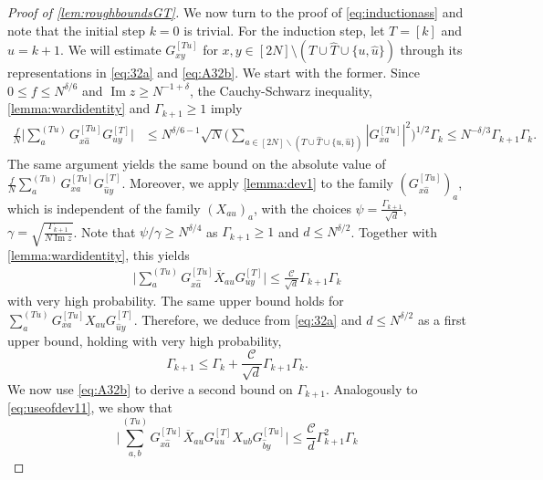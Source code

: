 \documentclass[10pt,a4paper]{amsart}
\DeclareMathOperator{\Ima}{Im}
\numberwithin{equation}{section}
\newcommand*\barr[1]{\overline{#1}}
\newcommand*\bset[1]{[#1]}
\newcommand*\ubarr[1]{{\widehat{#1}}}
\begin{document}
\begin{proof}[Proof of \cref{lem:roughboundsGT}]
		We now turn to the proof of \cref{eq:inductionass} and note that the initial step $k=0$ is trivial. For the induction step, let $T = [k]$ and $u =k+1$. 
		We will estimate $G_{xy}^{\bset{Tu}}$ for $x,y \in [2N]\setminus ( T \cup \ubarr{T} \cup \{u,\ubarr{u}\})$ through its representations in \cref{eq:32a} and \cref{eq:A32b}. 
		We start with the former. 
		Since  $0 \le f \le N^{\delta/6}$ and $\Ima z \ge N^{-1 + \delta}$, the Cauchy-Schwarz inequality,   \cref{lemma:wardidentity} and $\Gamma_{k+1} \geq 1$ imply
		\begin{align}
			\frac{f}{N}\biggl|\sum_{a}^{(Tu)} G_{x\ubarr{a}}^{\bset{Tu}} G_{uy}^{\bset{T}}\biggr|&\le N^{\delta/6 -1} \sqrt{N} \biggl( \sum_{a\in [2N] \backslash ( T \cup \ubarr{T} \cup \{u,\ubarr{u}\})}\left|G_{xa}^{\bset{Tu}}\right|^2\biggr)^{1/2}\Gamma_{k}
			\le N^{-\delta/3}  \Gamma_{k+1}\Gamma_k. \label{eq:boundoforf1}
		\end{align}
	 The same argument yields the same bound on the absolute value of $\frac{f}{N} \sum_{a}^{(Tu)} G_{xa}^{\bset{Tu}} G_{\ubarr{u}y}^{\bset{T}}$. Moreover, we apply     \cref{lemma:dev1} to the family $ (G_{x\ubarr{a}}^{\bset{Tu}})_{a}$, which is independent of the family $(X_{au})_{a}$, with the choices $\psi = \frac{\Gamma_{k+1}}{\sqrt{d}}$, $\gamma = \sqrt{\frac{\Gamma_{k+1}}{N\Ima z}}$. 
		Note that $\psi/\gamma \geq N^{\delta/4}$ as $\Gamma_{k+1} \geq 1$ and $d \leq N^{\delta/2}$. 
		Together with \cref{lemma:wardidentity}, this yields
		\begin{align}\label{eq:useofdev11}
			\biggl| \sum_{a}^{(Tu)} G_{x\ubarr{a}}^{\bset{Tu}} \barr{X}_{au} G_{uy}^{\bset{T}} \biggr| \le  \frac{\mathcal{C}}{\sqrt{d}}\Gamma_{k+1} \Gamma_{k}
		\end{align}
		with very high probability. The same upper bound holds for $\sum_{a}^{(Tu)} G_{xa}^{\bset{Tu}} X_{au} G_{\ubarr{u}y}^{\bset{T}}$. 
		Therefore, we deduce from \cref{eq:32a} and $d \leq N^{\delta/2}$ as a first upper bound, holding with very high probability, 
		\begin{equation}\label{eq:upbound1}
			\Gamma_{k+1} \le \Gamma_{k} + \frac{\mathcal{C}}{\sqrt{d}} \Gamma_{k+1}\Gamma_k.
		\end{equation}
		We now use \cref{eq:A32b} to derive a second bound on $\Gamma_{k+1}$. 
		Analogously to \cref{eq:useofdev11}, we show that 
		\begin{equation}\label{eq:useofdev12}
			\biggl| \sum_{a,b}^{(Tu)} G_{x\ubarr{a}}^{\bset{Tu}} \barr{X}_{au} G_{uu}^{\bset{T}} X_{ub} G_{\ubarr{b}y}^{\bset{Tu}}\biggr|\le \frac{\mathcal{C}}{d} \Gamma^{2}_{k+1} \Gamma_{k}

\end{equation}
\end{proof}
\end{document}
